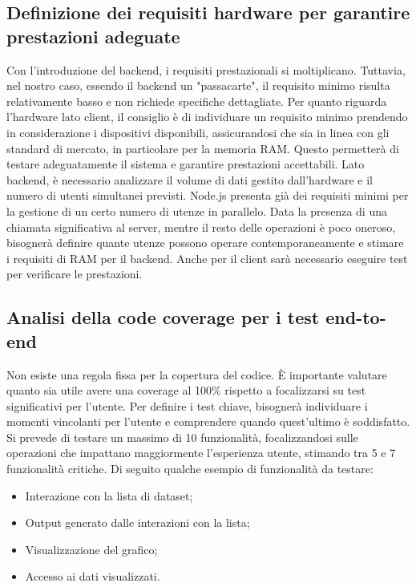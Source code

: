 \subsection{Definizione dei requisiti hardware per garantire prestazioni adeguate}
Con l'introduzione del backend, i requisiti prestazionali si moltiplicano. Tuttavia, nel nostro caso, essendo il backend un "passacarte", il requisito minimo risulta relativamente basso e non richiede specifiche dettagliate.
Per quanto riguarda l'hardware lato client, il consiglio è di individuare un requisito minimo prendendo in considerazione i dispositivi disponibili, assicurandosi che sia in linea con gli standard di mercato, in particolare per la memoria RAM. Questo permetterà di testare adeguatamente il sistema e garantire prestazioni accettabili.
Lato backend, è necessario analizzare il volume di dati gestito dall'hardware e il numero di utenti simultanei previsti. Node.js presenta già dei requisiti minimi per la gestione di un certo numero di utenze in parallelo. Data la presenza di una chiamata significativa al server, mentre il resto delle operazioni è poco oneroso, bisognerà definire quante utenze possono operare contemporaneamente e stimare i requisiti di RAM per il backend. Anche per il client sarà necessario eseguire test per verificare le prestazioni.

\subsection{Analisi della code coverage per i test end-to-end}
Non esiste una regola fissa per la copertura del codice. È importante valutare quanto sia utile avere una coverage al 100\% rispetto a focalizzarsi su test significativi per l'utente.
Per definire i test chiave, bisognerà individuare i momenti vincolanti per l'utente e comprendere quando quest'ultimo è soddisfatto. Si prevede di testare un massimo di 10 funzionalità, focalizzandosi sulle operazioni che impattano maggiormente l'esperienza utente, stimando tra 5 e 7 funzionalità critiche.
Di seguito qualche esempio di funzionalità da testare:
\begin{itemize}
\item Interazione con la lista di dataset;
\item Output generato dalle interazioni con la lista;
\item Visualizzazione del grafico;
\item Accesso ai dati visualizzati.
\end{itemize}

